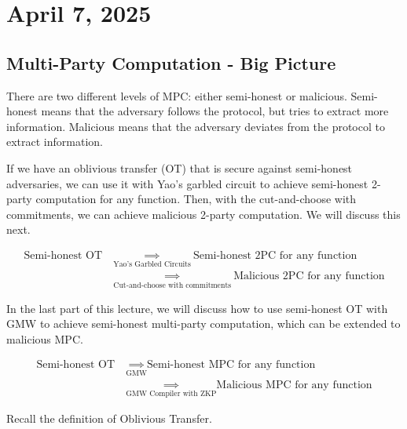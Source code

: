 \section{April 7, 2025}
\label{20250407}

\subsection{Multi-Party Computation - Big Picture}

There are two different levels of MPC: either semi-honest or malicious. Semi-honest means that the adversary follows the protocol, but tries to extract more information. Malicious means that the adversary deviates from the protocol to extract information.

If we have an oblivious transfer (OT) that is secure against semi-honest adversaries, we can use it with Yao's garbled circuit to achieve semi-honest 2-party computation for any function. Then, with the cut-and-choose with commitments, we can achieve malicious 2-party computation. We will discuss this next.

\begin{align*}
    \text{Semi-honest OT}\ & \underset{\text{Yao's Garbled Circuits}}{\implies}\ \text{Semi-honest 2PC for any function} \\
    & \underset{\text{Cut-and-choose with commitments}}{\implies}\ \text{Malicious 2PC for any function}
\end{align*}

In the last part of this lecture, we will discuss how to use semi-honest OT with GMW to achieve semi-honest multi-party computation, which can be extended to malicious MPC.

\begin{align*}
    \text{Semi-honest OT} \ & \underset{\text{GMW}}{\implies} \text{Semi-honest MPC for any function}\\
    & \underset{\text{GMW Compiler with ZKP}}{\implies} \text{Malicious MPC for any function}
\end{align*}

Recall the definition of Oblivious Transfer.


